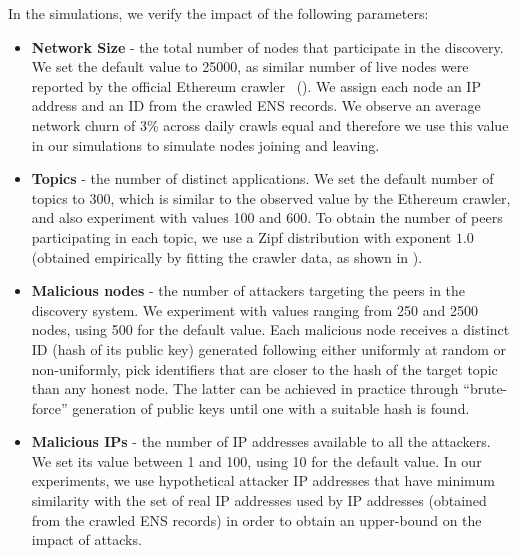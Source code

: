 In the simulations, we verify the impact of the following parameters:
 \begin{itemize}
     \item \textbf{Network Size} - the total number of nodes that participate in the discovery. We set the default value to 25000, as similar number of live nodes were reported by the official Ethereum crawler~\cite{discv4-dns-lists} (). We assign each node an IP address and an ID from the crawled ENS records. We observe an average network churn of 3\% across daily crawls equal and therefore we use this value in our simulations to simulate nodes joining and leaving. 
     \item \textbf{Topics} - the number of distinct applications. We set the default number of topics to 300, which is similar to the observed value by the Ethereum crawler, and also experiment with values 100 and 600. To obtain the number of peers participating in each topic, we use a Zipf distribution with exponent $1.0$ (obtained empirically by fitting the crawler data, as shown in ). 
     \item \textbf{Malicious nodes} - the number of attackers targeting the peers in the discovery system. We experiment with values ranging from 250 and 2500 nodes,  using 500 for the default value.  Each malicious node receives a distinct ID (\ie hash of its public key) generated following either uniformly at random or non-uniformly, \ie pick identifiers that are closer to the hash of the target topic than any honest node. The latter can be achieved in practice through ``brute-force'' generation of public keys until one with a suitable hash is found.
     \item \textbf{Malicious IPs} - the number of IP addresses available to all the attackers. We set its value between 1 and 100, using 10 for the default value.  In our experiments, we use hypothetical attacker IP addresses that have minimum similarity with the set of real IP addresses used by IP addresses (obtained from the crawled ENS records) in order to obtain an upper-bound on the impact of attacks. %

 \end{itemize}

